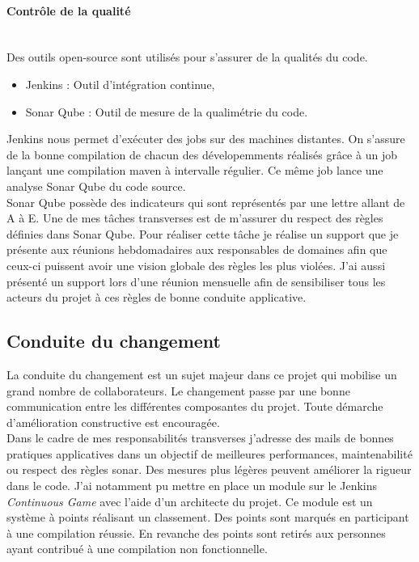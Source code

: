\documentclass[12pt,a4paper]{article}
\begin{document}
\paragraph{Contrôle de la qualité}
~~\\
Des outils open-source sont utilisés pour s'assurer de la qualités du code. 
\begin{itemize}
\item Jenkins : Outil d'intégration continue,
\item Sonar Qube : Outil de mesure de la qualimétrie du code.
\end{itemize}
Jenkins nous permet d'exécuter des jobs sur des machines distantes. On s'assure de la bonne compilation de chacun des dévelopemments réalisés grâce à un job lançant une compilation maven à intervalle régulier. Ce même job lance une analyse Sonar Qube du code source.\\
Sonar Qube possède des indicateurs qui sont représentés par une lettre allant de A à E. Une de mes tâches transverses est de m'assurer du respect des règles définies dans Sonar Qube. Pour réaliser cette tâche je réalise un support que je présente aux réunions hebdomadaires aux responsables de domaines afin que ceux-ci puissent avoir une vision globale des règles les plus violées. J'ai aussi présenté un support lors d'une réunion mensuelle afin de sensibiliser tous les acteurs du projet à ces règles de bonne conduite applicative.
\subsection{Conduite du changement}
La conduite du changement est un sujet majeur dans ce projet qui mobilise un grand nombre de collaborateurs. Le changement passe par une bonne communication entre les différentes composantes du projet. Toute démarche d'amélioration constructive est encouragée.\\
Dans le cadre de mes responsabilités transverses j'adresse des mails de bonnes pratiques applicatives dans un objectif de meilleures performances, maintenabilité ou respect des règles sonar.
Des mesures plus légères peuvent améliorer la rigueur dans le code. J'ai notamment pu mettre en place un module sur le Jenkins \emph{Continuous Game} avec l'aide d'un architecte du projet. Ce module est un système à points réalisant un classement. Des points sont marqués en participant à une compilation réussie. En revanche des points sont retirés aux personnes ayant contribué à une compilation non fonctionnelle.
\clearpage
\newpage
\end{document}
